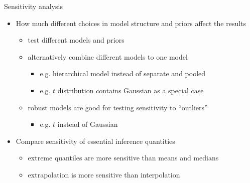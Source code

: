 \documentclass[t]{beamer}
\begin{document}
\begin{frame}

  {\Large\color{navyblue} Sensitivity analysis}

  \begin{itemize}
  \item How much different choices in model structure and priors affect the results
    \begin{itemize}
      \item<2-> test different models and priors
      \item<3-> alternatively combine different models to one model
        \begin{itemize}
        \item e.g. hierarchical model instead of separate and pooled
        \item e.g. $t$ distribution contains Gaussian as a special case
      \end{itemize}
      \item<3-> robust models are good for testing sensitivity to ``outliers''
        \begin{itemize}
        \item e.g. $t$ instead of Gaussian
        \end{itemize}
    \end{itemize}
    \item<4-> Compare sensitivity of essential inference quantities
      \begin{itemize}
      \item extreme quantiles are more sensitive than means and medians
      \item extrapolation is more sensitive than interpolation
      \end{itemize}
    \end{itemize}

\end{frame}
\end{document}
